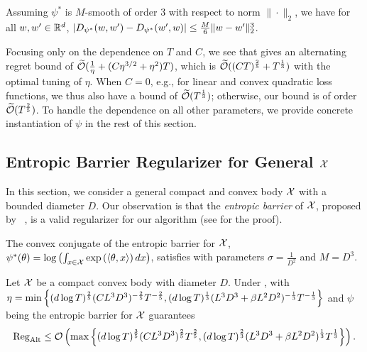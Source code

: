 \begin{lemma}\label{lem:bregman_commutator}
    Assuming $\psi^*$ is $M$-smooth of order $3$ with respect to norm $\|\cdot\|_2$, we have for all $w,w'\in\mathbb{R}^d$,
    $\lvert D_{\psi^*}(w,w')-D_{\psi^*}(w',w)\rvert \le \frac{M}{6}\lVert w-w'\rVert_2^3$.
\end{lemma}

Focusing only on the dependence on $T$ and $C$, we see that  gives an alternating regret bound of $\widetilde{\mathcal{O}}(\frac{1}{\eta}+(C\eta^{3/2}+\eta^2) T)$, which is $\widetilde{\mathcal{O}}((CT)^{\frac{2}{5}}+T^{\frac{1}{3}})$ with the optimal tuning of $\eta$. When $C=0$, e.g., for linear and convex quadratic loss functions, we thus also have a bound of $\widetilde{\mathcal{O}}(T^{\frac{1}{3}})$;
otherwise, our bound is of order $\widetilde{\mathcal{O}}(T^{\frac{2}{5}})$. To handle the dependence on all other parameters,
we provide concrete instantiation of $\psi$ in the rest of this section.

\subsection{Entropic Barrier Regularizer for General ${\mathcal{X}}$}\label{sec:entopic_barrier}
In this section, we consider a general compact and convex body ${\mathcal{X}}$ with a bounded diameter $D$.
Our observation is that the \emph{entropic barrier} of ${\mathcal{X}}$, proposed by ~\citet{bubeck2014entropic}, is a valid regularizer for our algorithm (see  for the proof).

\begin{lemma}\label{lem:entropic}
The convex conjugate of the entropic barrier for ${\mathcal{X}}$,
$\psi^*(\theta) = \log\left(\int_{x\in{\mathcal{X}}}\exp\left(\langle \theta, x \rangle\right)dx\right)$, satisfies  with parameters $\sigma = \frac{1}{D^2}$ and $M=D^3$.
\end{lemma}

\begin{corollary}\label{cor:entr_regularizer}
    Let ${\mathcal{X}}$ be a compact convex body with diameter $D$. Under ,  with $\eta=\min\left\{(d\log T)^{\frac{2}{5}}(CL^3D^3)^{-\frac{2}{5}}T^{-\frac{2}{5}},(d\log T)^{\frac{1}{3}}(L^3D^3+\beta L^2D^2)^{-\frac{1}{3}}T^{-\frac{1}{3}}\right\}$ and $\psi$ being the entropic barrier for ${\mathcal{X}}$ guarantees
    \begin{equation*}
    \mathrm{Reg}_{\mathrm{Alt}}\le\mathcal{O}\left(\max\left\{(d\log T)^{\frac{3}{5}}(CL^3D^3)^{\frac{2}{5}}T^{\frac{2}{5}},(d\log T)^{\frac{2}{3}}(L^3D^3+\beta L^2D^2)^{\frac{1}{3}}T^{\frac{1}{3}}\right\}\right).
    \end{equation*}
\end{corollary}

